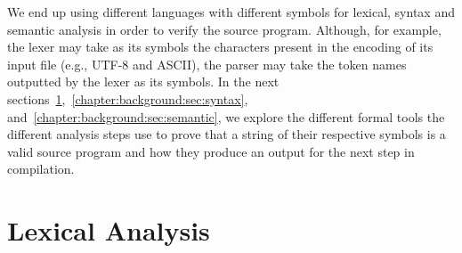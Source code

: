 \documentclass[
  oneside,
  english,
  coorientadorbanca,
  noabntexcite
]{ufsc-thesis-rn46-2019}
\begin{document}
We end up using different languages with different symbols for lexical, syntax and semantic analysis in order to verify the source program.
Although, for example, the lexer may take as its symbols the characters present in the encoding of its input file (e.g., UTF-8 and ASCII), the parser may take the token names outputted by the lexer as its symbols.
In the next sections~\ref{chapter:background:sec:lexical},~\ref{chapter:background:sec:syntax}, and~\ref{chapter:background:sec:semantic}, we explore the different formal tools the different analysis steps use to prove that a string of their respective symbols is a valid source program and how they produce an output for the next step in compilation.

\section{Lexical Analysis}\label{chapter:background:sec:lexical}
\end{document}
